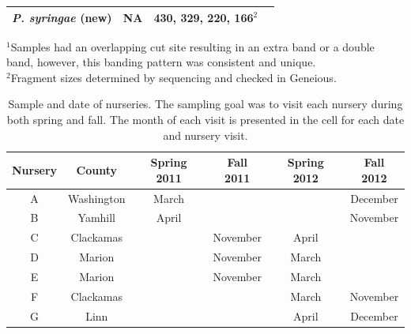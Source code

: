 \documentclass[12pt]{article}
\begin{document}
\begin{table}[!ht]
\begin{tabular}{lccc}
\emph{P. syringae} (new)	&	NA		&	430, 329, 220, 166$^{2}$	& \\
\hline
\end{tabular}
\label{tab:frags}
$^{1}$Samples had an overlapping cut site resulting in an extra band or a double band, however, this banding pattern was consistent and unique.\\
$^{2}$Fragment sizes determined by sequencing and checked in Geneious.
\end{table}


\begin{table}[!ht]
\caption{Sample and date of nurseries.  The sampling goal was to visit each nursery during both spring and fall.  The month of each visit is presented in the cell for each date and nursery visit.}
\begin{tabular}{cccccc}
\hline
\textbf{Nursery} & \textbf{County} & \textbf{Spring 2011} & \textbf{Fall 2011} & \textbf{Spring 2012} & \textbf{Fall 2012} \\
\hline
A & Washington & March & & & December \\
B & Yamhill & April & & & November \\
C & Clackamas & & November & April & \\
D & Marion & & November & March & \\
E & Marion & & November & March & \\
F & Clackamas & & & March & November \\
G & Linn & & & April & December \\
\hline
\end{tabular}
\label{tab:sample}
\end{table}
\end{document}
